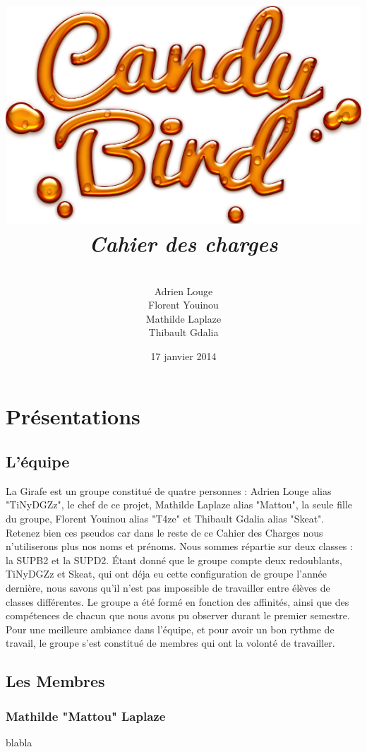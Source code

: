 \documentclass [11pt]{report}
\title{
	\includegraphics[scale=0.43]{images/Logojeu.png}
	 \\\vspace{20mm}
	\textbf{\Huge \itshape Cahier des charges }
	}
\author{ \\\vspace{2mm}
	Adrien Louge \\\vspace{2mm}
	Florent Youinou\\\vspace{2mm}
	Mathilde Laplaze\\\vspace{2mm}
	Thibault Gdalia\\\vspace{30mm}
	}
\date{17 janvier 2014}
\begin{document}
\renewcommand{\baselinestretch}{0.001}
\maketitle
\tableofcontents

\newpage
\chapter {Pr\'esentations}

	\section{ L'\'equipe }

		La Girafe est  un groupe constitué de quatre personnes : Adrien Louge alias "TiNyDGZz", le chef de ce projet, Mathilde Laplaze alias "Mattou", la seule fille du groupe, Florent Youinou alias "T4ze" et Thibault Gdalia alias "Skeat". Retenez bien ces pseudos car dans le reste de ce Cahier des Charges nous n'utiliserons plus nos noms et pr\'enoms. Nous sommes r\'epartie sur deux classes : la SUPB2 et la SUPD2.  \'Etant donné que le groupe compte deux redoublants, TiNyDGZz et Skeat, qui ont d\'eja eu cette configuration de groupe l'ann\'ee derni\`ere, nous savons qu'il n'est pas impossible de travailler entre \'el\`eves de classes diff\'erentes. Le groupe a \'et\'e form\'e en fonction des affinit\'es, ainsi que des comp\'etences de chacun que nous avons pu observer durant le premier semestre. Pour une meilleure ambiance dans l'\'equipe, et pour avoir un bon rythme de travail, le groupe s'est constitué de membres qui ont la volont\'e de travailler. 
	
	
	
	\newpage

	\section { Les Membres }
		\subsection {Mathilde "Mattou" Laplaze}
			blabla\\\vspace{10mm}
	
		
\end{document}
